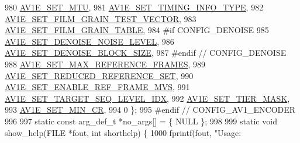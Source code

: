 \begin{DoxyCodeInclude}
{{{{{{{980                                         \hyperlink{group__aom__encoder_ggae78dde67a6d78f332e9bdba0dde42db5a353037d84b6c47ac0138fa843b70a2bb}{AV1E\_SET\_MTU},
981                                         \hyperlink{group__aom__encoder_ggae78dde67a6d78f332e9bdba0dde42db5a857e822046c62a4c774b1d16c4e453dd}{AV1E\_SET\_TIMING\_INFO\_TYPE},
982                                         \hyperlink{group__aom__encoder_ggae78dde67a6d78f332e9bdba0dde42db5a437e6b282a2395b4b08a9acde3e41cfb}{AV1E\_SET\_FILM\_GRAIN\_TEST\_VECTOR},
983                                         \hyperlink{group__aom__encoder_ggae78dde67a6d78f332e9bdba0dde42db5ad5846c6f49d37e65a03c39e68d487097}{AV1E\_SET\_FILM\_GRAIN\_TABLE},
984 \textcolor{preprocessor}{#if CONFIG\_DENOISE}
985                                         \hyperlink{group__aom__encoder_ggae78dde67a6d78f332e9bdba0dde42db5a54fe460f126a7566aa627cd82826faf0}{AV1E\_SET\_DENOISE\_NOISE\_LEVEL},
986                                         \hyperlink{group__aom__encoder_ggae78dde67a6d78f332e9bdba0dde42db5ae113c7e68a6c39b872a268ed6cdf6d10}{AV1E\_SET\_DENOISE\_BLOCK\_SIZE},
987 \textcolor{preprocessor}{#endif  // CONFIG\_DENOISE}
988                                         \hyperlink{group__aom__encoder_ggae78dde67a6d78f332e9bdba0dde42db5adaa8c4b0f736003b552d1d7d68877f6f}{AV1E\_SET\_MAX\_REFERENCE\_FRAMES},
989                                         \hyperlink{group__aom__encoder_ggae78dde67a6d78f332e9bdba0dde42db5a17fe8deb975a641c65d1dce6b5e3a4e0}{AV1E\_SET\_REDUCED\_REFERENCE\_SET},
990                                         \hyperlink{group__aom__encoder_ggae78dde67a6d78f332e9bdba0dde42db5a5e82346d8463bf758967abb0d03ebc88}{AV1E\_SET\_ENABLE\_REF\_FRAME\_MVS},
991                                         \hyperlink{group__aom__encoder_ggae78dde67a6d78f332e9bdba0dde42db5abc032ee5a8dc3f51ab88b64737590f1b}{AV1E\_SET\_TARGET\_SEQ\_LEVEL\_IDX},
992                                         \hyperlink{group__aom__encoder_ggae78dde67a6d78f332e9bdba0dde42db5a8a9265ce765bdcf9df119a7e5c7b3cc7}{AV1E\_SET\_TIER\_MASK},
993                                         \hyperlink{group__aom__encoder_ggae78dde67a6d78f332e9bdba0dde42db5afe2dd2cf29cc6202786ecbf132288d99}{AV1E\_SET\_MIN\_CR},
994                                         0 \};
995 \textcolor{preprocessor}{#endif  // CONFIG\_AV1\_ENCODER}
996 
997 \textcolor{keyword}{static} \textcolor{keyword}{const} arg\_def\_t *no\_args[] = \{ NULL \};
998 
999 \textcolor{keyword}{static} \textcolor{keywordtype}{void} show\_help(FILE *fout, \textcolor{keywordtype}{int} shorthelp) \{
1000   fprintf(fout, \textcolor{stringliteral}{"Usage: %
}}}}}}}}
\end{DoxyCodeInclude}
